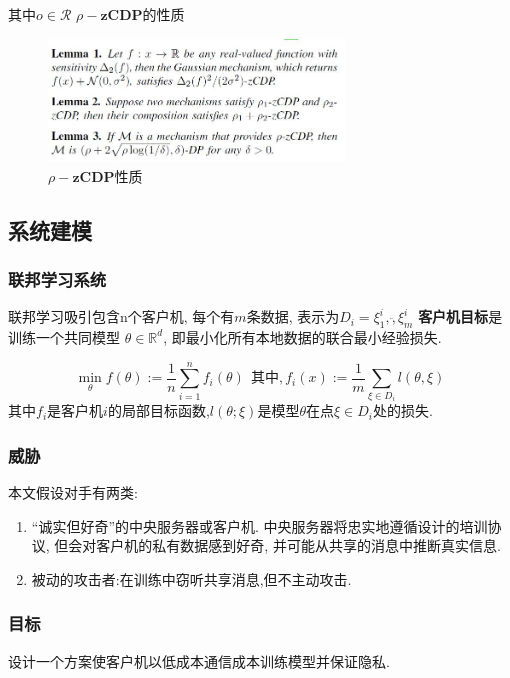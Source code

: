 \documentclass[a4paper]{article}
\theoremstyle{definition}
\numberwithin{equation}{section}
\begin{document}
其中$o \in \mathcal{R}$
$\rho-\textbf{zCDP}$的性质

\begin{figure}[ht]
    \setlength{\abovecaptionskip}{0.1cm}
    \centering    
    \includegraphics[width=0.7\textwidth]{CPFed/zCDPLemma.jpg}
    \caption{$\rho-\textbf{zCDP}$性质}
\end{figure}

\subsection{系统建模}
\subsubsection{联邦学习系统}
联邦学习吸引包含n个客户机, 每个有$m$条数据, 表示为$D_i = {\xi^i_1, \ddot,\xi^i_m}$
\textbf{客户机目标}是训练一个共同模型 $\theta \in \mathbb{R}^d$, 即最小化所有本地数据的联合最小经验损失.

\begin{equation}
    \min_\theta f(\theta) := \frac{1}{n} \sum^n_{i=1}f_i(\theta) \ \  \text{其中},f_i(x) := \frac{1}{m}\sum_{\xi\in D_i} l(\theta , \xi ) 
\end{equation}
其中$f_i$是客户机$i$的局部目标函数,$l(\theta; \xi)$是模型$\theta $在点$\xi\in D_i $处的损失.

\subsubsection{威胁}
本文假设对手有两类:
\begin{enumerate}
    \item “诚实但好奇”的中央服务器或客户机. 中央服务器将忠实地遵循设计的培训协议, 但会对客户机的私有数据感到好奇, 并可能从共享的消息中推断真实信息. 
    \item 被动的攻击者:在训练中窃听共享消息,但不主动攻击.
\end{enumerate}


\subsubsection{目标}
设计一个方案使客户机以低成本通信成本训练模型并保证隐私.
\end{document}
